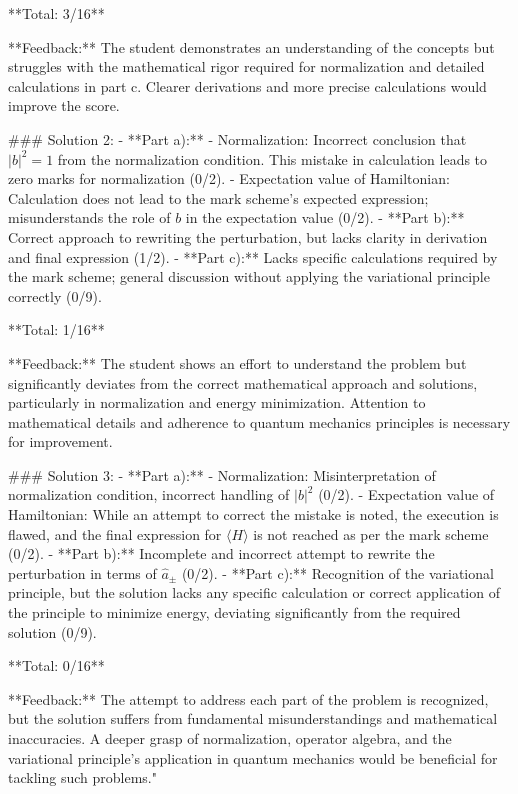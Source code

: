 \documentclass[a4paper,11pt]{article}
\begin{document}
**Total: 3/16**

**Feedback:** The student demonstrates an understanding of the concepts but struggles with the mathematical rigor required for normalization and detailed calculations in part c. Clearer derivations and more precise calculations would improve the score.

### Solution 2:
- **Part a):**
    - Normalization: Incorrect conclusion that \(|b|^2 = 1\) from the normalization condition. This mistake in calculation leads to zero marks for normalization (0/2).
    - Expectation value of Hamiltonian: Calculation does not lead to the mark scheme's expected expression; misunderstands the role of \(b\) in the expectation value (0/2).
- **Part b):** Correct approach to rewriting the perturbation, but lacks clarity in derivation and final expression (1/2).
- **Part c):** Lacks specific calculations required by the mark scheme; general discussion without applying the variational principle correctly (0/9).

**Total: 1/16**

**Feedback:** The student shows an effort to understand the problem but significantly deviates from the correct mathematical approach and solutions, particularly in normalization and energy minimization. Attention to mathematical details and adherence to quantum mechanics principles is necessary for improvement.

### Solution 3:
- **Part a):**
    - Normalization: Misinterpretation of normalization condition, incorrect handling of \(|b|^2\) (0/2).
    - Expectation value of Hamiltonian: While an attempt to correct the mistake is noted, the execution is flawed, and the final expression for \(\langle H \rangle\) is not reached as per the mark scheme (0/2).
- **Part b):** Incomplete and incorrect attempt to rewrite the perturbation in terms of \( \hat{a}_{\pm} \) (0/2).
- **Part c):** Recognition of the variational principle, but the solution lacks any specific calculation or correct application of the principle to minimize energy, deviating significantly from the required solution (0/9).

**Total: 0/16**

**Feedback:** The attempt to address each part of the problem is recognized, but the solution suffers from fundamental misunderstandings and mathematical inaccuracies. A deeper grasp of normalization, operator algebra, and the variational principle's application in quantum mechanics would be beneficial for tackling such problems."
\end{document}
